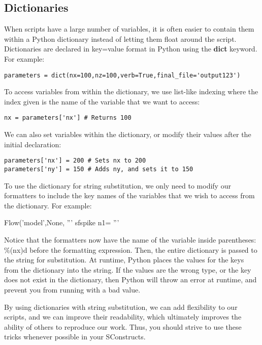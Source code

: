 \subsection{Dictionaries}

When scripts have a large number of variables, it is often easier to contain them within a Python dictionary instead of letting them float around the script.  Dictionaries are declared in key=value format in Python using the \textbf{dict} keyword.  For example:

\begin{verbatim}
parameters = dict(nx=100,nz=100,verb=True,final_file='output123')
\end{verbatim}

To access variables from within the dictionary, we use list-like indexing where the index given is the name of the variable that we want to access:

\begin{verbatim}
nx = parameters['nx'] # Returns 100
\end{verbatim}

We can also set variables within the dictionary, or modify their values after the initial declaration:

\begin{verbatim}
parameters['nx'] = 200 # Sets nx to 200
parameters['ny'] = 150 # Adds ny, and sets it to 150
\end{verbatim}

To use the dictionary for string substitution, we only need to modify our formatters to include the key names of the variables that we wish to access from the dictionary.  For example:

\begin{verbatimtab}[4]
Flow('model',None,
	'''
	sfspike n1=%
	''' %
\end{verbatimtab}
Notice that the formatters now have the name of the variable inside parentheses: \%(nx)d before the formatting expression.  Then, the entire dictionary is passed to the string for substitution.  At runtime, Python places the values for the keys from the dictionary into the string.  If the values are the wrong type, or the key does not exist in the dictionary, then Python will throw an error at runtime, and prevent you from running with a bad value.

By using dictionaries with string substitution, we can add flexibility to our scripts, and we can improve their readability, which ultimately improves the ability of others to reproduce our work.  Thus, you should strive to use these tricks whenever possible in your
SConstructs.

